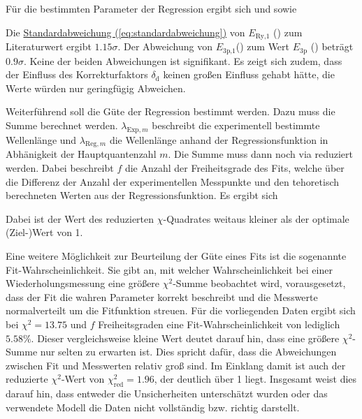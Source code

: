 Für die bestimmten Parameter der Regression ergibt sich
und 
sowie

Die \hyperref[eq:standardabweichung]{Standardabweichung (\ref*{eq:standardabweichung})} von $E_\text{Ry,1}$ () zum Literaturwert ergibt $1.15 \sigma$. 
Der Abweichung von $E_\text{3p,1}$() zum Wert $E_\text{3p}$ () beträgt $0.9\sigma$.
Keine der beiden Abweichungen ist signifikant. Es zeigt sich zudem, dass der Einfluss des Korrekturfaktors $\delta_\text{d}$ keinen großen Einfluss gehabt hätte, die Werte würden nur geringfügig Abweichen.

Weiterführend soll die Güte der Regression bestimmt werden. Dazu muss die Summe
berechnet werden. $\lambda_{\text{Exp},m}$ beschreibt die experimentell bestimmte Wellenlänge und $\lambda_{\text{Reg},m}$ die Wellenlänge anhand der Regressionsfunktion in Abhänigkeit der Hauptquantenzahl $m$. 
Die Summe muss dann noch via
reduziert werden. Dabei beschreibt $f$ die Anzahl der Freiheitsgrade des Fits, welche über die Differenz der Anzahl der experimentellen Messpunkte und den tehoretisch berechneten Werten aus der Regressionsfunktion. 
Es ergibt sich

Dabei ist der Wert des reduzierten $\chi$-Quadrates weitaus kleiner als der optimale (Ziel-)Wert von 1.

Eine weitere Möglichkeit zur Beurteilung der Güte eines Fits ist die sogenannte Fit-Wahrscheinlichkeit. Sie gibt an, mit welcher Wahrscheinlichkeit bei einer Wiederholungsmessung eine größere $\chi^2$-Summe beobachtet wird, vorausgesetzt, dass der Fit die wahren Parameter korrekt beschreibt und die Messwerte normalverteilt um die Fitfunktion streuen.
Für die vorliegenden Daten ergibt sich bei $\chi^2 = 13.75$ und $f$ Freiheitsgraden eine Fit-Wahrscheinlichkeit von lediglich $5.58\%$. Dieser vergleichsweise kleine Wert deutet darauf hin, dass eine größere $\chi^2$-Summe nur selten zu erwarten ist. Dies spricht dafür, dass die Abweichungen zwischen Fit und Messwerten relativ groß sind.
    Im Einklang damit ist auch der reduzierte $\chi^2$-Wert von $\chi^2_{\mathrm{red}} = 1.96$, der deutlich über 1 liegt. Insgesamt weist dies darauf hin, dass entweder die Unsicherheiten unterschätzt wurden oder das verwendete Modell die Daten nicht vollständig bzw. richtig darstellt.

